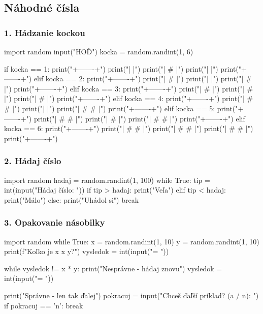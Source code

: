 \subsection{Náhodné čísla}
\subsubsection*{1. Hádzanie kockou}

\begin{solution}
import random
input("HOĎ")
kocka = random.randint(1, 6)

if kocka == 1:
	print("+-------+")
	print("|       |")
	print("|   #   |")
	print("|       |")
	print("+-------+")
elif kocka == 2:
	print("+-------+")
	print("| #     |")
	print("|       |")
	print("|     # |")
	print("+-------+")
elif kocka == 3:
	print("+-------+")
	print("| #     |")
	print("|   #   |")
	print("|     # |")
	print("+-------+")
elif kocka == 4:
	print("+-------+")
	print("| #   # |")
	print("|       |")
	print("| #   # |")
	print("+-------+")
elif kocka == 5:
	print("+-------+")
	print("| #   # |")
	print("|   #   |")
	print("| #   # |")
	print("+-------+")
elif kocka == 6:
	print("+-------+")
	print("| #   # |")
	print("| #   # |")
	print("| #   # |")
	print("+-------+")
\end{solution}

\subsubsection*{2. Hádaj číslo}
\begin{solution}
import random
hadaj = random.randint(1, 100)
while True:
	tip = int(input("Hádaj číslo: "))
	if tip > hadaj:
		print("Veľa")
	elif tip < hadaj:
        print("Málo")
    else:
        print("Uhádol si")
        break
\end{solution}


\subsubsection*{3. Opakovanie násobilky}
\begin{solution}
import random
while True:
    x = random.randint(1, 10)
    y = random.randint(1, 10)
    print(f"Koľko je {x} x {y}?")
    vysledok = int(input("= "))

    while vysledok != x * y:
        print("Nesprávne - hádaj znovu")
        vysledok = int(input("= "))

    print("Správne - len tak ďalej")
    pokracuj = input("Chceš ďaľší príklad? (a / n): ")
    if pokracuj == 'n':
        break
\end{solution}
